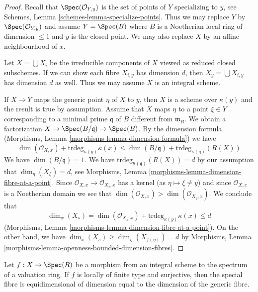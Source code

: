 \begin{proof}
Recall that $\Spec(\mathcal{O}_{Y, y})$
is the set of points of $Y$ specializing to $y$, see
Schemes, Lemma \ref{schemes-lemma-specialize-points}.
Thus we may replace $Y$ by $\Spec(\mathcal{O}_{Y, y})$
and assume $Y = \Spec(B)$ where $B$ is a Noetherian
local ring of dimension $\leq 1$ and $y$ is the closed point.
We may also replace $X$ by an affine neighbourhood of $x$.

\medskip\noindent
Let $X = \bigcup X_i$ be the irreducible components of $X$ viewed
as reduced closed subschemes. If we can show each fibre $X_{i, y}$
has dimension $d$, then $X_y = \bigcup X_{i, y}$ has dimension $d$ as
well. Thus we may assume $X$ is an integral scheme.

\medskip\noindent
If $X \to Y$ maps the generic point $\eta$ of $X$ to $y$, then $X$
is a scheme over $\kappa(y)$ and the result is true by assumption.
Assume that $X$ maps $\eta$ to a point $\xi \in Y$ corresponding
to a minimal prime $\mathfrak q$ of $B$ different from $\mathfrak m_B$.
We obtain a factorization $X \to \Spec(B/\mathfrak q) \to \Spec(B)$.
By the dimension formula
(Morphisms, Lemma \ref{morphisms-lemma-dimension-formula})
we have
$$
\dim(\mathcal{O}_{X, x}) + \text{trdeg}_{\kappa(y)} \kappa(x) \leq
\dim(B/\mathfrak q) + \text{trdeg}_{\kappa(\mathfrak q)}(R(X))
$$
We have $\dim(B/\mathfrak q) = 1$. We have
$\text{trdeg}_{\kappa(\mathfrak q)}(R(X)) = d$ by
our assumption that $\dim_\eta(X_\xi) = d$, see
Morphisms, Lemma \ref{morphisms-lemma-dimension-fibre-at-a-point}.
Since $\mathcal{O}_{X, x} \to \mathcal{O}_{X_s, x}$ has a kernel
(as $\eta \mapsto \xi \not = y$) and since $\mathcal{O}_{X, x}$
is a Noetherian domain we see that
$\dim(\mathcal{O}_{X, x}) > \dim(\mathcal{O}_{X_y, x})$.
We conclude that
$$
\dim_x(X_s) =
\dim(\mathcal{O}_{X_s, x}) + \text{trdeg}_{\kappa(y)} \kappa(x) \leq d
$$
(Morphisms, Lemma \ref{morphisms-lemma-dimension-fibre-at-a-point}).
On the other hand, we have
$\dim_x(X_s) \geq \dim_\eta(X_{f(\eta)}) = d$ by
Morphisms, Lemma \ref{morphisms-lemma-openness-bounded-dimension-fibres}.
\end{proof}

\begin{lemma}
\label{lemma-dominate-valuation-ring-dimension-fibres}
Let $f : X \to \Spec(R)$ be a morphism from an integral
scheme to the spectrum of a valuation ring. If $f$ is locally
of finite type and surjective, then the special fibre is
equidimensional of dimension equal to the dimension of the generic fibre.
\end{lemma}

